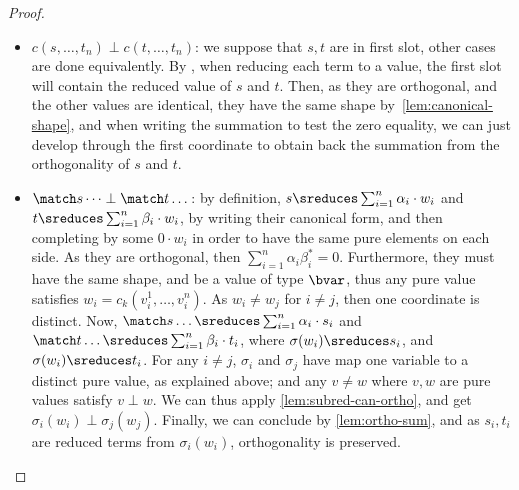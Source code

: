 \begin{proof}
\begin{itemize}
\begin{itemize}
        \item $c(s, \dots, t_n) \perp c(t, \dots, t_n)$: we suppose
          that $s, t$ are in first slot, other cases are done equivalently.
          By \evalcontext, when reducing each term to a value, the
          first slot will contain the reduced value of $s$ and $t$.
          Then, as they are orthogonal, and the other values are
          identical, they have the same shape
          by~\autoref{lem:canonical-shape}, and when writing the
          summation to test the zero equality,
          we can just develop through the first coordinate to obtain
          back the summation from the orthogonality of $s$ and $t$.
        \item $\match s \dots \perp \match t \dots$: by definition,
          $s \sreduces \sum_{i=1}^n \alpha_i \cdot w_i$ and $t
          \sreduces \sum_{i=1}^n \beta_i \cdot w_i$,
          by writing their canonical form, and then completing by
          some $0 \cdot w_i$ in order to have the same pure elements
          on each side.
          As they are orthogonal, then $\sum_{i=1}^n \alpha_i \beta_i^* = 0$.
          Furthermore, they must have the same shape, and be a value
          of type $\bvar$, thus any pure value satisfies $w_i =
          c_k(v_i^1, \dots, v_i^n)$.
          As $w_i \neq w_j$ for $i \neq j$, then one coordinate is distinct.
          Now, $\match s \dots \sreduces \sum_{i=1}^n \alpha_i \cdot
          s_i$ and $\match t \dots \sreduces \sum_{i=1}^n
          \beta_i \cdot t_i$, where $\sigma(w_i) \sreduces s_i$,
          and $\sigma(w_i) \sreduces t_i$.
          For any $i \neq j$, $\sigma_i$ and $\sigma_j$ have map one
          variable to a distinct pure value, as explained above;
          and any $v \neq w$ where $v, w$ are pure values satisfy $v \perp w$.
          We can thus apply \autoref{lem:subred-can-ortho}, and get
          $\sigma_i(w_i) \perp \sigma_j(w_j)$.
          Finally, we can conclude by \autoref{lem:ortho-sum},
          and as $s_i, t_i$ are reduced terms from $\sigma_i(w_i)$,
          orthogonality is preserved.
      \end{itemize}


\end{itemize}
\end{proof}
